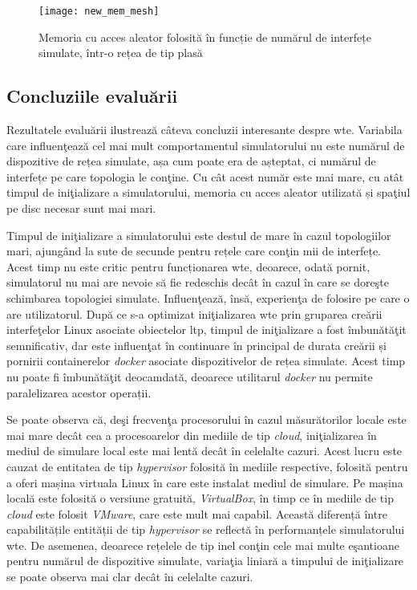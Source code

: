 \begin{figure}[h]
	\centering
	\texttt{[image: new\_mem\_mesh]}
	\caption{Memoria cu acces aleator folosită în funcție de numărul de interfețe simulate, într-o rețea de tip plasă}
	\label{fig:new_mem_mesh}
\end{figure}

\subsection{Concluziile evaluării}

Rezultatele evaluării ilustrează câteva concluzii interesante despre \gls{wte}. Variabila care influenţează cel mai mult comportamentul simulatorului nu este numărul de dispozitive de rețea simulate, așa cum poate era de așteptat, ci numărul de interfețe pe care topologia le conţine. Cu cât acest număr este mai mare, cu atât timpul de iniţializare a simulatorului, memoria cu acces aleator utilizată și spaţiul pe disc necesar sunt mai mari.

Timpul de iniţializare a simulatorului este destul de mare în cazul topologiilor mari, ajungând la sute de secunde pentru rețele care conţin mii de interfețe. Acest timp nu este critic pentru funcționarea \gls{wte}, deoarece, odată pornit, simulatorul nu mai are nevoie să fie redeschis decât în cazul în care se doreşte schimbarea topologiei simulate. Influenţează, însă, experienţa de folosire pe care o are utilizatorul. După ce s-a optimizat iniţializarea \gls{wte} prin gruparea creării interfeţelor Linux asociate obiectelor \gls{ltp}, timpul de iniţializare a fost îmbunătăţit semnificativ, dar este influenţat în continuare în principal de durata creării și pornirii containerelor \textit{docker} asociate dispozitivelor de rețea simulate. Acest timp nu poate fi îmbunătăţit deocamdată, deoarece utilitarul \textit{docker} nu permite paralelizarea acestor operații.

Se poate observa că, deşi frecvenţa procesorului în cazul măsurătorilor locale este mai mare decât cea a procesoarelor din mediile de tip \textit{cloud}, iniţializarea în mediul de simulare local este mai lentă decât în celelalte cazuri. Acest lucru este cauzat de entitatea de tip \textit{hypervisor} folosită în mediile respective, folosită pentru a oferi mașina virtuala Linux în care este instalat mediul de simulare. Pe mașina locală este folosită o versiune gratuită, \textit{VirtualBox}, în timp ce în mediile de tip \textit{cloud} este folosit \textit{VMware}, care este mult mai capabil. Această diferență între capabilitățile entității de tip \textit{hypervisor} se reflectă în performanțele simulatorului \gls{wte}. De asemenea, deoarece rețelele de tip inel conţin cele mai multe eşantioane pentru numărul de dispozitive simulate, variaţia liniară a timpului de iniţializare se poate observa mai clar decât în celelalte cazuri.

